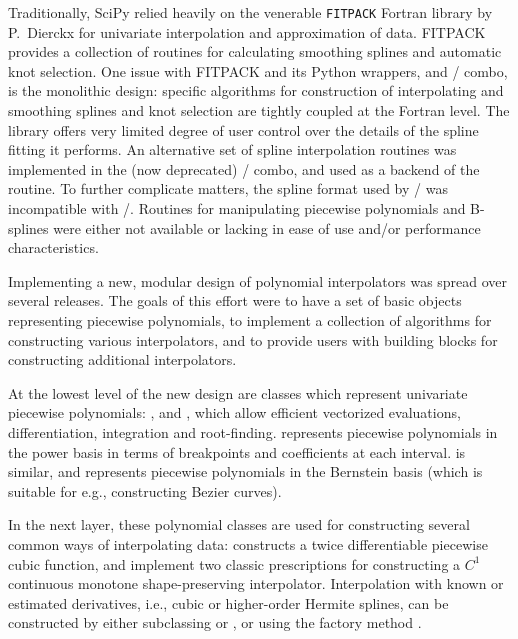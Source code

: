 
Traditionally, SciPy relied heavily on the venerable \texttt{FITPACK}
Fortran library by P.~Dierckx \cite{Dierckx:1993:CSF:151103, FITPACK} for
univariate interpolation and approximation of data. FITPACK provides a
collection of routines for calculating smoothing splines and automatic knot
selection. One issue with FITPACK and its Python wrappers,  and / combo, is the monolithic design: specific
algorithms for construction of interpolating and smoothing splines and knot
selection are tightly coupled at the Fortran level. The library offers very
limited degree of user control over the details of the spline fitting it performs. 
%
An alternative set of spline interpolation routines was implemented in the
(now deprecated) / combo, and used as a backend of
the  routine. To further complicate matters, the spline format
used by / was incompatible with
/.
%
Routines for manipulating piecewise polynomials and B-splines were either not available or lacking in ease of use and/or performance characteristics.

Implementing a new, modular design of polynomial interpolators was spread over
several releases. The goals of this effort were to have a set of basic objects
representing piecewise polynomials, to implement a collection of algorithms
for constructing various interpolators, and to provide users with building
blocks for constructing additional interpolators.

At the lowest level of the new design are classes which represent univariate
piecewise polynomials: ,  and , which allow
efficient vectorized evaluations, differentiation, integration and root-finding.
 represents piecewise polynomials in the power basis in terms of
breakpoints and coefficients at each interval.  is similar, and
represents piecewise polynomials in the Bernstein basis (which is suitable
for e.g., constructing Bezier curves).

In the next layer, these polynomial classes are used for constructing several common ways of interpolating data:  constructs a twice differentiable piecewise cubic function,  and  implement two classic prescriptions for constructing a $C^1$ continuous monotone shape-preserving interpolator. \cite{FritschCarlson1980, Akima1970}
%
Interpolation with known or estimated derivatives, i.e., cubic or higher-order Hermite splines, can be constructed by either subclassing  or , or using the factory method .


